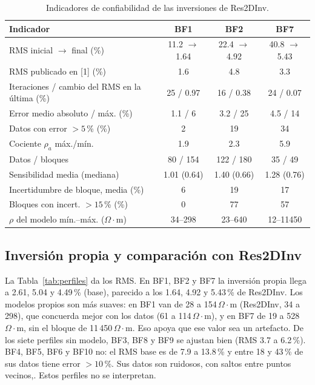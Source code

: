 \documentclass[conference]{IEEEtran}
\newcommand{\ohmm}{\ensuremath{\Omega\!\cdot\!\mathrm{m}}}
\begin{document}
\begin{table}[!t]
\caption{Indicadores de confiabilidad de las inversiones de Res2DInv.}
\label{tab:conf}
\centering\footnotesize
\setlength{\tabcolsep}{3pt}
\begin{tabular}{p{3.55cm}ccc}
\toprule
Indicador & BF1 & BF2 & BF7 \\
\midrule
RMS inicial $\to$ final (\%) & 11.2 $\to$ 1.64 & 22.4 $\to$ 4.92 & 40.8 $\to$ 5.43 \\
RMS publicado en [1] (\%) & 1.6 & 4.8 & 3.3 \\
Iteraciones / cambio del RMS en la última (\%) & 25 / 0.97 & 16 / 0.38 & 24 / 0.07 \\
Error medio absoluto / máx. (\%) & 1.1 / 6 & 3.2 / 25 & 4.5 / 14 \\
Datos con error $>5$\,\% (\%) & 2 & 19 & 34 \\
Cociente $\rho_a$ máx./mín. & 1.9 & 2.3 & 5.9 \\
Datos / bloques & 80 / 154 & 122 / 180 & 35 / 49 \\
Sensibilidad media (mediana) & 1.01 (0.64) & 1.40 (0.66) & 1.28 (0.76) \\
Incertidumbre de bloque, media (\%) & 6 & 19 & 17 \\
Bloques con incert. $>15$\,\% (\%) & 0 & 77 & 57 \\
$\rho$ del modelo mín.--máx. (\ohmm) & 34--298 & 23--640 & 12--11450 \\
\bottomrule
\end{tabular}
\end{table}


\subsection{Inversi\'on propia y comparaci\'on con Res2DInv}
La Tabla~\ref{tab:perfiles} da los RMS. En BF1, BF2 y BF7 la inversi\'on propia llega a 2.61, 5.04 y 4.49\,\% (base), parecido a los 1.64, 4.92 y 5.43\,\% de Res2DInv. Los modelos propios son m\'as suaves: en BF1 van de 28 a 154\,\ohmm{} (Res2DInv, 34 a 298), que concuerda mejor con los datos (61 a 114\,\ohmm), y en BF7 de 19 a 528\,\ohmm, sin el bloque de 11\,450\,\ohmm. Eso apoya que ese valor sea un artefacto. De los siete perfiles sin modelo, BF3, BF8 y BF9 se ajustan bien (RMS 3.7 a 6.2\,\%). BF4, BF5, BF6 y BF10 no: el RMS base es de 7.9 a 13.8\,\% y entre 18 y 43\,\% de sus datos tiene error $>10$\,\%. Sus datos son ruidosos, con saltos entre puntos vecinos,. Estos perfiles no se interpretan.
\end{document}

